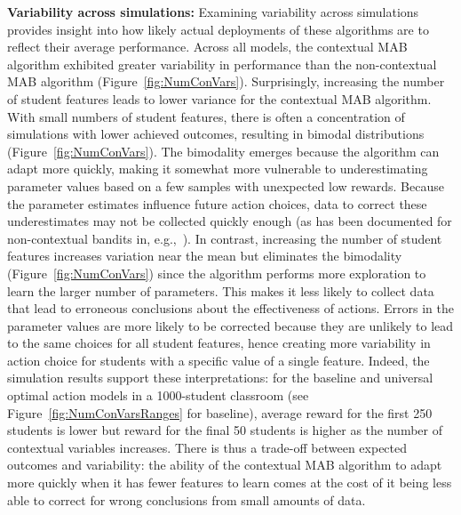 \textbf{Variability across simulations:} Examining variability across simulations provides insight into how likely actual deployments of these algorithms are to reflect their average performance. Across all models, the contextual MAB algorithm exhibited greater variability in performance than the non-contextual MAB algorithm (Figure~\ref{fig:NumConVars}).
Surprisingly, increasing the number of student features leads to lower variance for the contextual MAB algorithm.  With small numbers of student features, there is often a concentration of simulations with lower achieved outcomes, resulting in bimodal distributions (Figure~\ref{fig:NumConVars}).   
The bimodality emerges because the algorithm can adapt more quickly, making it somewhat more vulnerable to underestimating parameter values based on a few samples with unexpected low rewards. Because the parameter estimates influence future action choices, data to correct these underestimates may not be collected quickly enough (as has been documented for non-contextual bandits in, e.g.,~\cite{erraqabi2017trading}). In contrast, increasing the number of student features increases variation near the mean but eliminates the bimodality (Figure~\ref{fig:NumConVars}) since the algorithm performs more exploration to learn the larger number of parameters. This makes it less likely to collect data that lead to erroneous conclusions about the effectiveness of actions. Errors in the parameter values are more likely to be corrected because they are unlikely to lead to the same choices for all student features, hence creating more variability in action choice for students with a specific value of a single feature. Indeed, the simulation results support these interpretations: for the baseline and universal optimal action models in a 1000-student classroom (see Figure~\ref{fig:NumConVarsRanges} for baseline), average reward for the first 250 students is lower but reward for the final 50 students is higher as the number of contextual variables increases.  There is thus a trade-off between expected outcomes and variability: the ability of the contextual MAB algorithm to adapt more quickly when it has fewer features to learn comes at the cost of it being less able to correct for wrong conclusions from small amounts of data.

